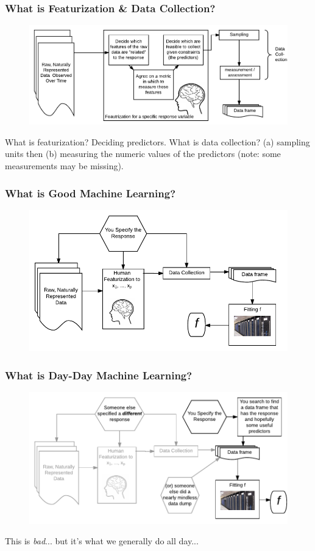 \documentclass[slides]{beamer} %
\begin{document}
\begin{frame}\frametitle{What is Featurization \& Data Collection?}

\begin{figure}
\centering
\includegraphics[width=4.5in]{featurization}
\end{figure}

What is featurization?  \pause Deciding predictors. What is data collection?  \pause (a) sampling units then  \pause (b) measuring the numeric values of the predictors  \pause (note: some measurements may be missing).

\end{frame}

\begin{frame}\frametitle{What is Good Machine Learning?}
\begin{figure}
\centering
\includegraphics[width=4.5in]{good_machine_learning}
\end{figure}

	
\end{frame}

\begin{frame}\frametitle{What is Day-Day Machine Learning?}
\begin{figure}
\centering
\includegraphics[width=4.5in]{bad_machine_learning}
\end{figure}

This is \emph{bad}... but it's what we generally do all day...
	
\end{frame}
\end{document}
